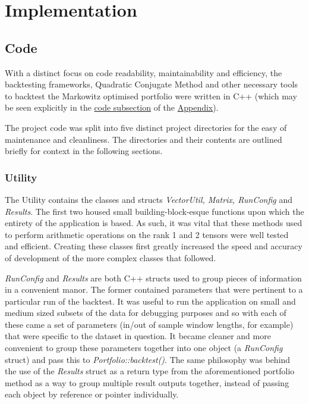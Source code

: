 \documentclass{article}
\begin{document}
\section{Implementation}
\label{sec:implementation}

\subsection{Code}
\label{sec:implementation_code}


With a distinct focus on code readability, maintainability and efficiency, the backtesting frameworks, Quadratic Conjugate Method and other necessary tools to backtest the Markowitz optimised portfolio were written in C++ (which may be seen explicitly in the  \hyperref[sec:code]{code subsection} of the \hyperref[sec:appendix]{Appendix}).


The project code was split into five distinct project directories for the easy of maintenance and cleanliness. The directories and their contents are outlined briefly for context in the following sections.

\subsubsection{Utility}
\label{sec:utility}

The Utility contains the classes and structs \textit{VectorUtil, Matrix, RunConfig} and \textit{Results}. 
The first two housed small building-block-esque functions upon which the entirety of the application is based. As such, it was vital that these methods used to perform arithmetic operations on the rank 1 and 2 tensors were well tested and efficient. Creating these classes first greatly increased the speed and accuracy of development of the more complex classes that followed.

\textit{RunConfig}  and \textit{Results} are both C++ structs used to group pieces of information in a convenient manor. The former contained parameters that were pertinent to a particular run of the backtest. It was useful to run the application on small and medium sized subsets of the data for debugging purposes and so with each of these came a set of parameters (in/out of sample window lengths, for example) that were specific to the dataset in question. It became cleaner and more convenient to group these parameters together into one object (a \textit{RunConfig} struct) and pass this to \textit{Portfolio::backtest()}.  
The same philosophy was behind the use of the \textit{Results} struct as a return type from the aforementioned portfolio method as a way to group multiple result outputs together, instead of passing each object by reference or pointer individually. 
\end{document}
